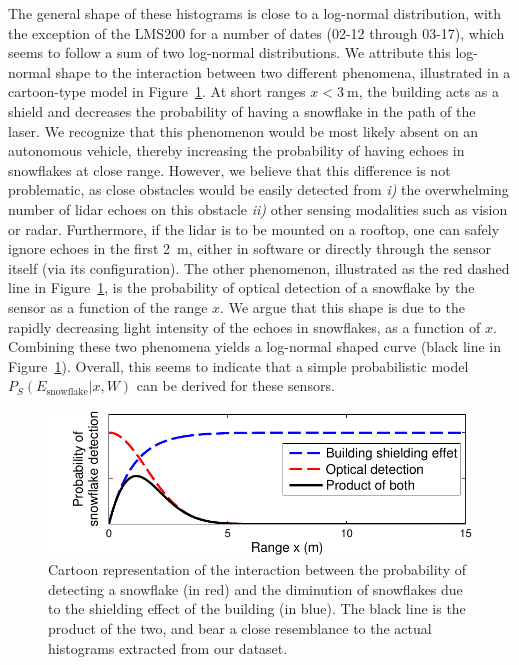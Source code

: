 The general shape of these histograms is close to a log-normal distribution, with the exception of the LMS200 for a number of dates (02-12 through 03-17), which seems to follow a sum of two log-normal distributions. We attribute this log-normal shape to the interaction between two different phenomena, illustrated in a cartoon-type model in Figure~\ref{fig:CartoonModel}. At short ranges $x<\SI{3}{\meter}$, the building acts as a shield and decreases the probability of having a snowflake in the path of the laser. We recognize that this phenomenon would be most likely absent on an autonomous vehicle, thereby increasing the probability of having echoes in snowflakes at close range. However, we believe that this difference is not problematic, as close obstacles would be easily detected from \emph{i)} the overwhelming number of  \gls*{lidar} echoes on this obstacle \emph{ii)} other sensing modalities such as vision or radar. Furthermore, if the \gls*{lidar} is to be mounted on a rooftop, one can safely  ignore echoes in the first \SI{2}{\meter}, either in software or directly through the sensor itself (via its configuration). The other phenomenon, illustrated as the red dashed line in Figure~\ref{fig:CartoonModel}, is the probability of optical detection of a snowflake by the sensor as a function of the range $x$. We argue that this shape is due to the rapidly decreasing light intensity of the echoes in snowflakes, as a function of $x$. Combining these two phenomena yields a log-normal shaped curve (black line in Figure~\ref{fig:CartoonModel}). Overall, this seems to indicate that a simple probabilistic model $P_S(E_\text{snowflake}|x,W)$ can be derived for these sensors.

\begin{figure}
    \centering
    \includegraphics[trim={0.6cm 0 0 0},clip,width=0.7\linewidth]{./img/chap_lidar/ShieldingModel.pdf}
    \caption[Cartoon representation of the interaction between the probability of detecting a snowflake and the diminution of snowflakes due to the shielding effect of the building.]{Cartoon representation of the interaction between the probability of detecting a snowflake (in red) and the diminution of snowflakes due to the shielding effect of the building (in blue). The black line is the product of the two, and bear a close resemblance to the actual histograms extracted from our dataset.}
    \label{fig:CartoonModel}
\end{figure}



